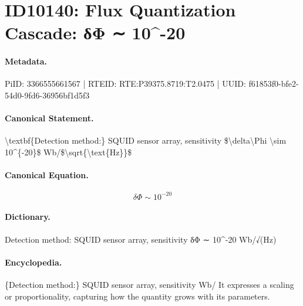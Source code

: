 \section*{ID10140: Flux Quantization Cascade: δΦ ∼ 10\textasciicircum{}-20}
\paragraph{Metadata.}
PiID: 3366555661567 | RTEID: RTE:P39375.8719:T2.0475 | UUID: f61853f0-bfe2-54d0-9fd6-36956bf1d5f3

\paragraph{Canonical Statement.}
\textbackslash{}textbf\{Detection method:\} SQUID sensor array, sensitivity \$\textbackslash{}delta\textbackslash{}Phi \textbackslash{}sim 10\textasciicircum{}\{-20\}\$ Wb/\$\textbackslash{}sqrt\{\textbackslash{}text\{Hz\}\}\$

\paragraph{Canonical Equation.}
\[
\delta\Phi \sim 10^{-20}
\]

\paragraph{Dictionary.}
Detection method: SQUID sensor array, sensitivity δΦ ∼ 10\textasciicircum{}-20 Wb/√(Hz)

\paragraph{Encyclopedia.}
\{Detection method:\} SQUID sensor array, sensitivity Wb/ It expresses a scaling or proportionality, capturing how the quantity grows with its parameters.
